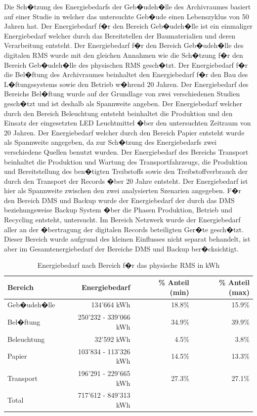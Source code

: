\documentclass[a4paper,twoside,10pt]{report}
\begin{document}
Die Sch�tzung des Energiebedarfs der Geb�udeh�lle des Archivraumes basiert auf einer Studie in welcher das untersuchte Geb�ude einen Lebenszyklus von 50 Jahren hat. Der Energiebedarf f�r den Bereich Geb�udeh�lle ist ein einmaliger Energiebedarf welcher durch das Bereitstellen der Baumaterialien und deren Verarbeitung entsteht. Der Energiebedarf f�r den Bereich Geb�udeh�lle des digitalen \ac{RMS} wurde mit den gleichen Annahmen wie die Sch�tzung f�r den Bereich Geb�udeh�lle des physischen \ac{RMS} gesch�tzt. Der Energiebedarf f�r die Bel�ftung des Archivraumes beinhaltet den Energiebedarf f�r den Bau des L�ftungssystems sowie den Betrieb w�hrend 20 Jahren. Der Energiebedarf des Bereichs Bel�ftung wurde auf der Grundlage von zwei verschiedenen Studien gesch�tzt und ist deshalb als Spannweite angeben. Der Energiebedarf welcher durch den Bereich Beleuchtung entsteht beinhaltet die Produktion und den Einsatz der eingesetzten LED Leuchtmittel �ber den untersuchten Zeitraum von 20 Jahren. Der Energiebedarf welcher durch den Bereich Papier entsteht wurde als Spannweite angegeben, da zur Sch�tzung des Energiebedarfs zwei verschiedene Quellen benutzt wurden. Der Energiebedarf des Bereichs Transport beinhaltet die Produktion und Wartung des Transportfahrzeugs, die Produktion und Bereitstellung des ben�tigten Treibstoffs sowie den Treibstoffverbrauch der durch den Transport der Records �ber 20 Jahre entsteht. Der Energiebedarf ist hier als Spannweite zwischen den zwei analysierten Szenarien angegeben. F�r den Bereich \ac{DMS} und Backup wurde der Energiebedarf der durch das \ac{DMS} beziehungsweise Backup System �ber die Phasen Produktion, Betrieb und Recycling entsteht, untersucht. Im Bereich Netzwerk wurde der Energiebedarf aller an der �bertragung der digitalen Records beteiligten Ger�te gesch�tzt. Dieser Bereich wurde aufgrund des kleinen Einflusses nicht separat behandelt, ist aber im Gesamtenergiebedarf der Bereiche \ac{DMS} und Backup ber�cksichtigt. 

\begin{table} [h]
	\begin{tabular}{l|r|r|r}
	\hline
	\textbf{Bereich} & \textbf{Energiebedarf} & \textbf{\% Anteil (min)}& \textbf{\% Anteil (max)}\\
	\hline
	Geb�udeh�lle	& 134'664 kWh 						& 18.8\% 		& 15.9\% \\
	Bel�ftung			&	250'232 - 339'066 kWh 	& 34.9\% 		& 39.9\% \\
	Beleuchtung 	& 32'592 kWh 				 			& 4.5\% 		& 3.8\% \\
	Papier 				& 103'834 - 113'326 kWh 	& 14.5\% 		& 13.3\% \\
	Transport		 	&	196'291 - 229'665 kWh 	& 27.3\% 		& 27.1\% \\
	\hline
	\hline
	Total  & 717'612 - 849'313 kWh & & \\
	\hline
	\end{tabular}
\caption{Energiebedarf nach Bereich f�r das physische RMS in kWh} 
\label{tab:ges_energ_phys}
\end{table}
\end{document}
